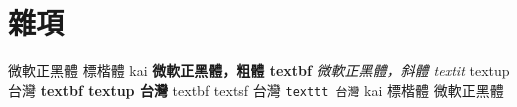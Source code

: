 \chapter{雜項}
微軟正黑體
{\kai 標楷體 kai}
\textbf{微軟正黑體，粗體 textbf}
\textit{微軟正黑體，斜體 textit}
\textup{textup 台灣}
\textbf{\textup{textbf textup 台灣}}
\textsf{textbf textsf 台灣}
\texttt{texttt 台灣}
{\kai kai 標楷體}
微軟正黑體
\XeTeX \XeLaTeX